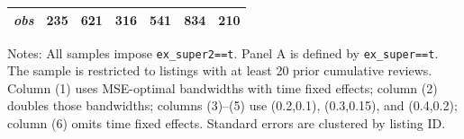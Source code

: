 \begin{table}[!htbp]
\begin{tabular}{lcccccc}
\textit{obs} & 235 & 621 & 316 & 541 & 834 & 210 \\
\bottomrule
\end{tabular}
\begin{minipage}{0.98\textwidth}\footnotesize
Notes: All samples impose \texttt{ex\_super2==t}. Panel A is defined by \texttt{ex\_super==t}. The sample is restricted to listings with at least 20 prior cumulative reviews. Column (1) uses MSE-optimal bandwidths with time fixed effects; column (2) doubles those bandwidths; columns (3)--(5) use (0.2,0.1), (0.3,0.15), and (0.4,0.2); column (6) omits time fixed effects. Standard errors are clustered by listing ID.
\end{minipage}
\end{table}
